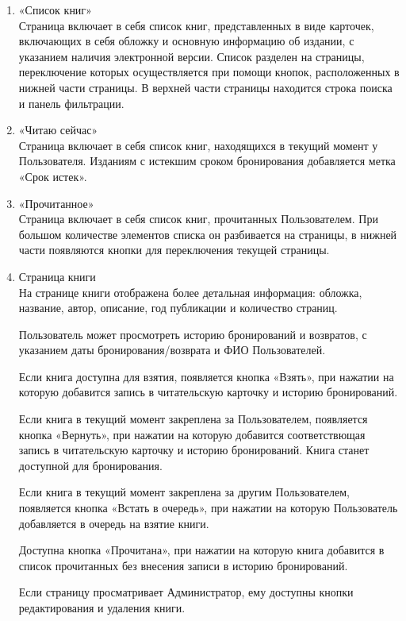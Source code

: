 \documentclass[project.tex]{subfiles}
\begin{document}
\begin{enumerate}
    \item «Список книг»\\
    Страница включает в себя список книг, представленных в виде карточек, включающих в себя обложку и основную информацию об издании, с указанием наличия электронной версии.
    Список разделен на страницы, переключение которых осуществляется при помощи кнопок, расположенных в нижней части страницы.
    В верхней части страницы находится строка поиска и панель фильтрации.
    \item «Читаю сейчас»\\
    Страница включает в себя список книг, находящихся в текущий момент у Пользователя. Изданиям с истекшим сроком бронирования добавляется метка «Срок истек».
    \item «Прочитанное»\\
    Страница включает в себя список книг, прочитанных Пользователем. При большом количестве элементов списка он разбивается на страницы, в нижней части появляются кнопки для переключения текущей страницы.
    \item Страница книги\\
    На странице книги отображена более детальная информация: обложка, название, автор, описание, год публикации и количество страниц.
    \par
    Пользователь может просмотреть историю бронирований и возвратов, с указанием даты бронирования/возврата и ФИО Пользователей.
    \par
    Если книга доступна для взятия, появляется кнопка «Взять», при нажатии на которую добавится запись в читательскую карточку и историю бронирований.
    \par
    Если книга в текущий момент закреплена за Пользователем, появляется кнопка «Вернуть», при нажатии на которую добавится соответствющая запись в читательскую карточку и историю бронирований. Книга станет доступной для бронирования.
    \par
    Если книга в текущий момент закреплена за другим Пользователем, появляется кнопка «Встать в очередь», при нажатии на которую Пользователь добавляется в очередь на взятие книги.
    \par
    Доступна кнопка «Прочитана», при нажатии на которую книга добавится в список прочитанных без внесения записи в историю бронирований.
    \par
    Если страницу просматривает Администратор, ему доступны кнопки редактирования и удаления книги.
    \par

\end{enumerate}
\end{document}

